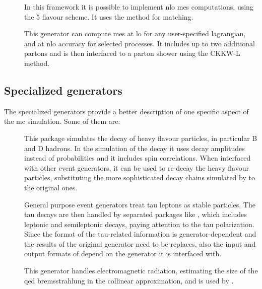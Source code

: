 \begin{description}
\item[\PowhegBox] \cite{Alioli:2010xd} In this framework it is possible to implement \gls{nlo} \glspl{me} computations, using the 5 flavour scheme.
It uses the \Powheg method for matching. 

\item[\aNLO] \cite{Alwall:2014hca} This generator can compute \glspl{me} at \gls{lo} for any user-specified lagrangian, and at \gls{nlo} accuracy for selected processes. It includes up to two additional partons and is then interfaced to a parton shower using the CKKW-L method. 

\end{description}

\subsection{Specialized generators}

The specialized generators provide a better description of one specific aspect of the \gls{mc} simulation. Some of them are:

\begin{description}
\item[\evtgen] \cite{Lange:2001uf} This package simulates the decay of heavy flavour particles, in particular B and D hadrons. 
In the simulation of the decay it uses decay amplitudes instead of probabilities and it includes spin correlations. 
When interfaced with other event generators, it can be used to re-decay the heavy flavour particles, substituting the more sophisticated decay chains simulated by \evtgen to the original ones.

\item[\tauola] \cite{Jadach:1990mz} General purpose event generators treat tau leptons as stable particles. 
The tau decays are then handled by separated packages like \tauola, which includes leptonic and semileptonic decays, paying attention to the tau polarization. Since the format of the tau-related information is generator-dependent and the results of the original generator need to be replaces, also the input and output formats of \tauola depend on the generator it is interfaced with.

\item[\photos] \cite{Barberio:1990ms} This generator handles electromagnetic radiation, estimating the size of the \gls{qed} bremsstrahlung in the collinear approximation, and is used by \tauola. 


\end{description}


